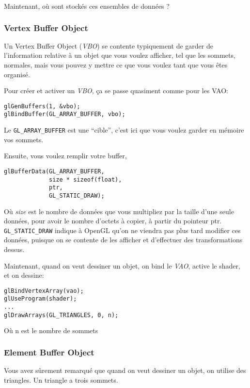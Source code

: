 \documentclass[pdftex, 11pt, a4paper, titlepage]{article}
\begin{document}
Maintenant, où sont stockés ces ensembles de données ?

\pagebreak

\subsubsection{Vertex Buffer Object}

Un Vertex Buffer Object (\emph{VBO}) se contente typiquement de garder de
l'information relative à un objet que vous voulez afficher, tel que
les sommets, normales, mais vous pouvez y mettre ce que vous voulez
tant que vous êtes organisé.

Pour créer et activer un \emph{VBO}, ça se passe quasiment comme pour les
VAO:

\begin{lstlisting}
glGenBuffers(1, &vbo);
glBindBuffer(GL_ARRAY_BUFFER, vbo);
\end{lstlisting}

Le \texttt{GL\_ARRAY\_BUFFER} est une ``cible'', c'est ici que vous
voulez garder en mémoire vos sommets.

Ensuite, vous voulez remplir votre buffer,

\begin{lstlisting}
glBufferData(GL_ARRAY_BUFFER,
             size * sizeof(float),
             ptr,
             GL_STATIC_DRAW);
\end{lstlisting}

Où \textit{size} est le nombre de données que vous multipliez par la taille
d'une seule données, pour avoir le nombre d'octets à copier, à partir
du pointeur ptr.  \texttt{GL\_STATIC\_DRAW} indique à OpenGL qu'on ne
viendra pas plus tard modifier ces données, puisque on se contente de
les afficher et d'effectuer des transformations dessus.

Maintenant, quand on veut dessiner un objet, on bind le \emph{VAO}, active le
shader, et on dessine:

\begin{lstlisting}
glBindVertexArray(vao);
glUseProgram(shader);
...
glDrawArrays(GL_TRIANGLES, 0, n);
\end{lstlisting}

Où n est le nombre de sommets

\pagebreak
\subsubsection{Element Buffer Object}

Vous avez sûrement remarqué que quand on veut dessiner un objet, on
utilise des triangles.  Un triangle a trois sommets.
\end{document}
